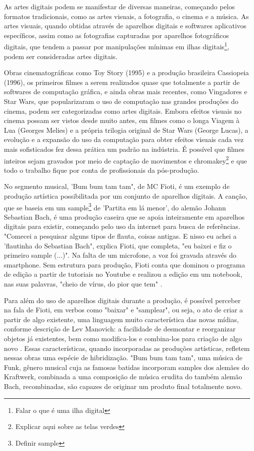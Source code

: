 As artes digitais podem se manifestar de diversas maneiras, começando  pelos formatos tradicionais, como as artes visuais, a fotografia, o cinema e a música. As artes visuais, quando obtidas através de aparelhos digitais e softwares aplicativos específicos, assim como as fotografias capturadas por aparelhos fotográficos digitais, que tendem a passar por manipulações mínimas em ilhas digitais\footnote{Falar o que é uma ilha digital}, podem ser consideradas artes digitais. 

Obras cinematográficas como Toy Story (1995) e a produção brasileira Cassiopeia (1996), os primeiros filmes a serem realizados quase que totalmente a partir de softwares de computação gráfica, e ainda obras mais recentes, como Vingadores e Star Wars, que popularizaram o uso de computação nas grandes produções do cinema, podem ser categorizadas como artes digitais. Embora efeitos visuais no cinema possam ser vistos desde muito antes, em filmes como o longa Viagem à Lua (Georges Melies) e a própria trilogia original de Star Wars (George Lucas), a evolução e a expansão do uso da computação para obter efeitos visuais cada vez mais sofisticados fez dessa prática um padrão na indústria. É possível que filmes inteiros sejam gravados por meio de captação de movimentos e chromakey\footnote{Explicar aqui sobre as telas verdes} e que todo o trabalho fique por conta de profissionais da pós-produção. 

No segmento musical, 'Bum bum tam tam", de MC Fioti, é um exemplo de produção artística possibilitada por um conjunto de aparelhos digitais. A canção, que se baseia em um sample\footnote{Definir sample} de 'Partita em lá menor', do alemão Johann Sebastian Bach, é uma produção caseira que se apoia inteiramente em aparelhos digitais para existir, começando pelo uso da internet para busca de referências. "Comecei a pesquisar alguns tipos de flauta, coisas antigas. E nisso eu achei a 'flautinha do Sebastian Bach", explica Fioti, que completa, "eu baixei e fiz o primeiro sample (...)". Na falta de um microfone, a voz foi gravada através do smartphone. Sem estrutura para produção, Fioti conta que dominou o programa de edição a partir de tutoriais no Youtube e realizou a edição em um notebook, nas suas palavras, "cheio de vírus, do pior que tem" \cite{Ortega}. 

Para além do uso de aparelhos digitais durante a produção, é possível perceber na fala de Fioti, em verbos como "baixar" e "samplear", ou seja, o ato de criar a partir de algo existente, uma linguagem muito característica das novas mídias, conforme descrição de Lev Manovich: a facilidade de desmontar e reorganizar objetos já existentes, bem como modifica-los e combina-los para criação de algo novo \cite{Martino}. Essas características, quando incorporadas as produções artísticas, refletem nessas obras uma espécie de hibridização. "Bum bum tam tam", uma música de Funk, gênero musical cuja as famosas batidas incorporam samples dos alemães do Kraftwerk, combinada a uma composição de música erudita do também alemão Bach, recombinadas, são capazes de originar um produto final totalmente novo.

